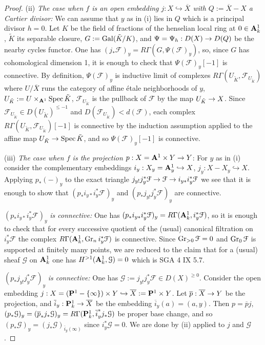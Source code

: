 \documentclass[deligne.tex]{subfiles}
\begin{document}
\begin{proof}
(ii) \emph{The case when $f$ is an open embedding $j:X\hookrightarrow\overline X$ with $Q:=\overline X-X$ a Cartier divisor:}
We can assume that $y$ as in (i) lies in $Q$ which is a principal divisor 
$h=0$. Let $K$ be the field of fractions of the henselian local ring at
$0\in\mathbf{A}^1_k$, $\tilde K$ its separable closure, $G:=\operatorname{Gal}(\tilde K/K)$, and
$\Psi=\Psi_h:D(X)\rightarrow D(Q)$ be the nearby cycles functor. One has 
$(j_*\mathcal F)_y=R\Gamma(G,\Psi(\mathcal F)_y)$, so, since $G$ has
cohomological dimension 1, it is enough to check that
$\Psi(\mathcal F)_y[-1]$ is connective. By definition, $\Psi(\mathcal F)_y$
is inductive limit of complexes
$R\Gamma(U_{\tilde K},\mathcal F_{U_{\tilde K}})$ where $U/\overline X$
runs the category of affine étale neighborhoods of $y$,
$U_{\tilde K}:=U\times_{\mathbf{A}^1}\operatorname{Spec}\tilde K$, $\mathcal F_{U_{\tilde K}}$ is
the pullback of $\mathcal F$ by the map $U_{\tilde K}\rightarrow X$.
Since $\mathcal F_{U_{\tilde K}}\in D(U_{\tilde K})^{\leq-1}$ and
$D(\mathcal F_{U_{\tilde K}})<d(\mathcal F)$, each complex
$R\Gamma(U_{\tilde K},\mathcal F_{U_{\tilde K}})[-1]$ is connective by the
induction assumption applied to the affine map
$U_{\tilde K}\rightarrow\operatorname{Spec}\tilde K$, and so $\Psi(\mathcal F)_y[-1]$ is
connective.

(iii) \emph{The case when $f$ is the projection} $p:X=\mathbf{A}^1\times Y\rightarrow Y$:
For $y$ as in (i) consider the complementary embeddings 
$i_y:X_y=\mathbf{A}^1_y\hookrightarrow X$, $j_y:X-X_y\hookrightarrow X$.
Applying $p_*(-)_y$ to the exact triangle
$j_{y!}j_y^*\mathcal F\rightarrow\mathcal F\rightarrow i_{y*}i_y^*\mathcal F$ we see that 
it is enough to show that $(p_*i_{y*}i_y^*\mathcal F)_y$ and
$(p_*j_{y!}j_y^*\mathcal F)_y$ are connective.

$(p_*i_{y*}i_y^*\mathcal F)_y$ \emph{is connective:}
One has $(p_*i_{y*}i_y^*\mathcal F)_y=R\Gamma(\mathbf{A}^1_k,i_y^*\mathcal F)$, so 
it is enough to check that for every successive quotient of the (usual)
canonical filtration on $i_y^*\mathcal F$ the complex
$R\Gamma(\mathbf{A}^1_k,\operatorname{Gr}_ni_y^*\mathcal F)$ is connective.
Since $\operatorname{Gr}_{>0}\mathcal F=0$ and $\operatorname{Gr}_0\mathcal F$ is supported at finitely 
many points, we are reduced to the claim that for a (usual) sheaf
$\mathcal G$ on $\mathbf{A}^1_k$ one has $H^{>1}(\mathbf{A}^1_k,\mathcal G)=0$ which is
SGA 4 IX 5.7.

$(p_*j_{y!}j_y^*\mathcal F)_y$ \emph{is connective:}
One has $\mathcal G:=j_{y!}j_y^*\mathcal F\in D(X)^{\geq0}$.
Consider the open embedding
$j:X=(\mathbf{P}^1-\{\infty\})\times Y\hookrightarrow\overline X:=\mathbf{P}^1\times Y$.
Let $\overline p:\overline X\rightarrow Y$ be the projection, and
$\overline{i}_y:\mathbf{P}^1_k\rightarrow\overline X$ be the embedding
$\overline{i}_y(a)=(a,y)$. Then $p=\overline pj$,
$(p_*\mathcal G)_y=(\overline p_*j_*\mathcal G)_y=R\Gamma(\mathbf{P}^1_k,\overline{i}^*_yj_*\mathcal G)$ be proper base change, and so
$(p_*\mathcal G)_y=(j_*\mathcal G)_{\overline{i}_y(\infty)}$
since $i_y^*\mathcal G=0$. We are done by (ii) applied to $j$ and
$\mathcal G$.


\end{proof}
\end{document}
